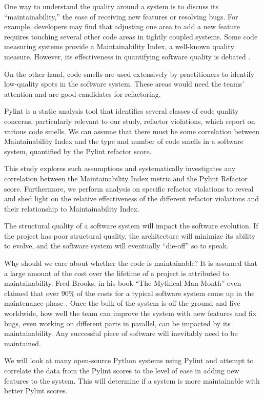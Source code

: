 \documentclass[12pt,conference]{IEEEtran}
\begin{document}
One way to understand the quality around a system is to discuss its ``maintainability,'' the ease of receiving new features or resolving bugs. For example, developers may find that adjusting one area to add a new feature requires touching several other code areas in tightly coupled systems. Some code measuring systems provide a Maintainability Index, a well-known quality measure. However, its effectiveness in quantifying software quality is debated \cite{vandeursen:2014}.

On the other hand, code smells are used extensively by practitioners to identify low-quality spots in the software system. These areas would need the teams' attention and are good candidates for refactoring.

Pylint is a static analysis tool that identifies several classes of code quality concerns, particularly relevant to our study, refactor violations, which report on various code smells. We can assume that there must be some correlation between Maintainability Index and the type and number of code smells in a software system, quantified by the Pylint refactor score.

This study explores such assumptions and systematically investigates any correlation between the Maintainability Index metric and the Pylint Refactor score. Furthermore, we perform analysis on specific refactor violations to reveal and shed light on the relative effectiveness of the different refactor violations and their relationship to Maintainability Index.

The structural quality of a software system will impact the software evolution. If the project has poor structural quality, the architecture will minimize its ability to evolve, and the software system will eventually ``die-off'' so to speak.

Why should we care about whether the code is maintainable? It is assumed that a large amount of the cost over the lifetime of a project is attributed to maintainability. Fred Brooks, in his book ``The Mythical Man-Month'' even claimed that over 90\% of the costs for a typical software system come up in the maintenance phase \cite{brooks:mythical}. Once the bulk of the system is off the ground and live worldwide, how well the team can improve the system with new features and fix bugs, even working on different parts in parallel, can be impacted by its maintainability. Any successful piece of software will inevitably need to be maintained.

We will look at many open-source Python systems using Pylint and attempt to correlate the data from the Pylint scores to the level of ease in adding new features to the system. This will determine if a system is more maintainable with better Pylint scores. 
\end{document}
